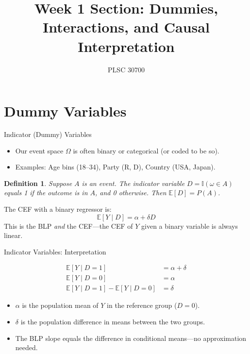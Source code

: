 \documentclass[aspectratio=169]{beamer}
\title[PLSC 30700]{Week 1 Section: Dummies, Interactions, and Causal Interpretation}
\author{PLSC 30700}
\institute[Chicago]{University of Chicago}
\newtheorem{defn}{Definition}
\numberwithin{equation}{section}
\begin{document}
\begin{frame}
\maketitle
\end{frame}


\section{Dummy Variables}

\setcounter{subsection}{1}
\begin{frame}{Indicator (Dummy) Variables}
\begin{itemize}
\item Our event space $\Omega$ is often binary or categorical (or coded to be so).
\item[-] Examples: Age bins (18--34), Party (R, D), Country (USA, Japan).
\end{itemize}
\bigskip
\begin{defn}
Suppose $A$ is an event.  The \emph{indicator variable} $D = \mathbb{I}(\omega \in A)$ equals 1 if the outcome is in $A$, and 0 otherwise.  Then $\mathbb{E}[D] = P(A)$.
\end{defn}
\medskip
The CEF with a binary regressor is:
$$\mathbb{E}[Y \mid D] = \alpha + \delta D$$
This is the BLP \emph{and} the CEF---the CEF of $Y$ given a binary variable is always linear.
\end{frame}

\begin{frame}{Indicator Variables: Interpretation}

\begin{align*}
\mathbb{E}[Y \mid D = 1] & =\alpha+\delta \\
\mathbb{E}[Y \mid D = 0] & =\alpha \\
\mathbb{E}[Y \mid D = 1]-\mathbb{E}[Y \mid D = 0]&=\delta
\end{align*}
\pause
\begin{itemize}
\item $\alpha$ is the population mean of $Y$ in the reference group ($D=0$).
\item $\delta$ is the population difference in means between the two groups.
\item The BLP slope equals the difference in conditional means---no approximation needed.
\end{itemize}

\end{frame}
\end{document}
